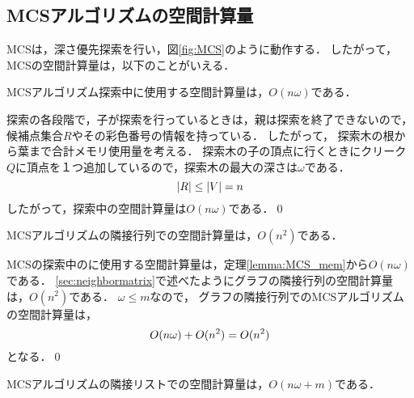 

\subsection{MCSアルゴリズムの空間計算量}
MCSは，深さ優先探索を行い，図\ref{fig:MCS}のように動作する．
したがって，MCSの空間計算量は，以下のことがいえる．

\begin{lemma}[MCSアルゴリズムの探索中の空間計算量] 
    \label{lemma:MCS_mem}
    MCSアルゴリズム探索中に使用する空間計算量は，$O(n\omega)$である．
\end{lemma}
\begin{Proof*}{}
    探索の各段階で，子が探索を行っているときは，親は探索を終了できないので，候補点集合$R$やその彩色番号の情報を持っている．
    したがって，
    探索木の根から葉まで合計メモリ使用量を考える．
    探索木の子の頂点に行くときにクリーク$Q$に頂点を１つ追加しているので，探索木の最大の深さは$\omega$である．
    \begin{equation}
     |R| \leq  |V| = n 
    \notag
    \end{equation}
    したがって，探索中の空間計算量は$O(n \omega)$である．\qed
\end{Proof*}
\begin{lemma}[MCSアルゴリズムの隣接行列での空間計算量]
    MCSアルゴリズムの隣接行列での空間計算量は，$O(n^2)$である．
\end{lemma}
\begin{Proof*}{}
    MCSの探索中のに使用する空間計算量は，定理\ref{lemma:MCS_mem}から$O(n\omega)$である．
    \ref{sec:neighbormatrix}で述べたようにグラフの隣接行列の空間計算量は，$O(n^2)$である．
    $ \omega \leq m$なので，
    グラフの隣接行列でのMCSアルゴリズムの空間計算量は，
    \begin{equation}
	O( n\omega ) + O( n^2 ) = O(n^2 )
    \notag
    \end{equation}
    となる．\qed
\end{Proof*}
\begin{lemma}[MCSアルゴリズムの隣接リストでの空間計算量]
    MCSアルゴリズムの隣接リストでの空間計算量は，$O(n \omega + m )$である．
\end{lemma}

